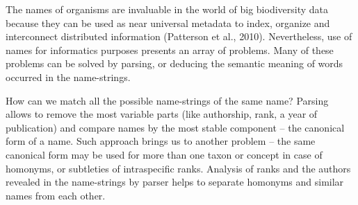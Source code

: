 \documentclass{bmcart}
\begin{document}
The names of organisms are invaluable in the world of big biodiversity data
because they can be used as near universal metadata to index, organize and
interconnect distributed information (Patterson et al., 2010). Nevertheless,
use of names for informatics purposes presents an array of problems. Many of
these problems can be solved by parsing, or deducing the semantic meaning of
words occurred in the name-strings.

How can we match all the possible name-strings of the same name? Parsing allows
to remove the most variable parts (like authorship, rank, a year of
publication) and compare names by the most stable component -- the canonical
form of a name. Such approach brings us to another problem -- the same
canonical form may be used for more than one taxon or concept in case of
homonyms, or subtleties of intraspecific ranks. Analysis of ranks and the
authors revealed in the name-strings by parser helps to separate homonyms and
similar names from each  other.
\end{document}
